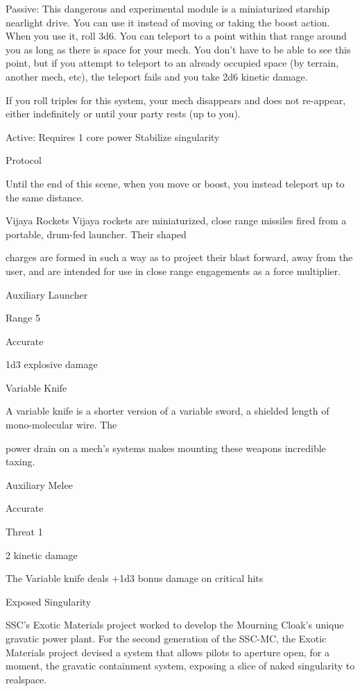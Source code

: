    Passive:
  This dangerous and experimental module is a miniaturized starship nearlight drive. You can use it
   instead of moving or taking the boost action. When you use it, roll 3d6. You can teleport to a point
  within that range around you as long as there is space for your mech. You don’t have to be able to see
  this point, but if you attempt to teleport to an already occupied space (by terrain, another mech, etc),
  the teleport fails and you take 2d6 kinetic damage.


   If you roll triples for this system, your mech disappears and does not re-appear, either indefinitely or
   until your party rests (up to you).


  Active: Requires 1 core power
  Stabilize singularity

   Protocol

   Until the end of this scene, when you move or boost, you instead teleport up to the same distance.

Vijaya Rockets
Vijaya rockets are miniaturized, close range missiles fired from a portable, drum-fed launcher. Their shaped

charges are formed in such a way as to project their blast forward, away from the user, and are intended for
use in close range engagements as a force multiplier.

Auxiliary Launcher

Range 5

Accurate

1d3 explosive damage


Variable Knife

A variable knife is a shorter version of a variable sword, a shielded length of mono-molecular wire. The

power drain on a mech’s systems makes mounting these weapons incredible taxing.

Auxiliary Melee

Accurate

Threat 1

2 kinetic damage

The Variable knife deals +1d3 bonus damage on critical hits

Exposed Singularity




SSC’s Exotic Materials project worked to develop the Mourning Cloak’s unique gravatic power plant. For the
second generation of the SSC-MC, the Exotic Materials project devised a system that allows pilots to
aperture open, for a moment, the gravatic containment system, exposing a slice of naked singularity to
realspace.

